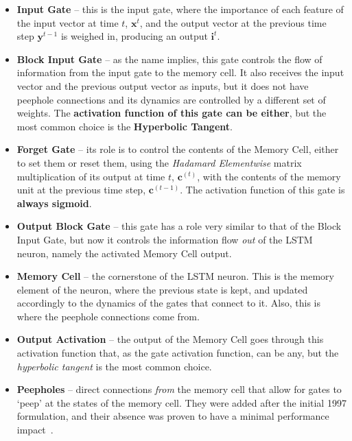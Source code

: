 \documentclass{IEEEtran}
\newcommand{\mb}[1]{\mathbf{#1}}
\begin{document}
\begin{itemize}
    \item \textbf{Input Gate} -- this is the input gate, where the importance of each feature of the input vector at time $t$, $\mb{x}^t$, and the output vector at the previous time step $\mb{y}^{t-1}$ is weighed in, producing an output $\mb{i}^{t}$.

    \item \textbf{Block Input Gate} -- as the name implies, this gate controls the flow of information from the input gate to the memory cell. It also receives the input vector and the previous output vector as inputs, but it does not have peephole connections and its dynamics are controlled by a different set of weights. The \textbf{activation function of this gate can be either}, but the most common choice is the \textbf{Hyperbolic Tangent}.

    \item \textbf{Forget Gate} -- its role is to control the contents of the Memory Cell, either to set them or reset them, using the \textit{Hadamard Elementwise} matrix multiplication of its output at time $t$, $\mb{c}^{(t)}$, with the contents of the memory unit at the previous time step, $\mb{c}^{(t-1)}$. The activation function of this gate is \textbf{always sigmoid}.

    \item \textbf{Output Block Gate} -- this gate has a role very similar to that of the Block Input Gate, but now it controls the information flow \textit{out} of the LSTM neuron, namely the activated Memory Cell output.

    \item \textbf{Memory Cell} -- the cornerstone of the LSTM neuron. This is the memory element of the neuron, where the previous state is kept, and updated accordingly to the dynamics of the gates that connect to it. Also, this is where the peephole connections come from. 

    \item \textbf{Output Activation} -- the output of the Memory Cell goes through this activation function that, as the gate activation function, can be any, but the \textit{hyperbolic tangent} is the most common choice.

    \item \textbf{Peepholes} -- direct connections \textit{from} the memory cell that allow for gates to `peep' at the states of the memory cell. They were added after the initial 1997 formulation, and their absence was proven to have a minimal performance impact~\cite{Greff15}.
\end{itemize}
\end{document}
